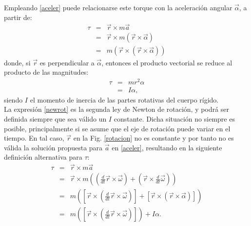 Empleando \eqref{aceler} puede relacionarse este torque con la aceleración angular $\vec{\alpha}$, a partir de:
\begin{eqnarray*}
\tau & = & \vec{r}\times m\vec{a}\\
     & = & \vec{r}\times m\left(\vec{r} \times \vec{\alpha}\right)\\
     & = & m\left(\vec{r}\times \left(\vec{r} \times \vec{\alpha}\right)\right)
\end{eqnarray*}
donde, si $\vec{r}$ es perpendicular a $\vec{\alpha}$, entonces el producto vectorial se reduce al producto de las magnitudes:
\begin{eqnarray}\label{newrot}
\nonumber \tau & = & m r^2 \alpha \\
               & = & I \alpha,
\end{eqnarray}
siendo $I$ el momento de inercia de las partes rotativas del cuerpo rígido.\\

La expresión \eqref{newrot} es la segunda ley de Newton de rotación, y podrá ser definida siempre que sea válido un $I$ constante. Dicha situación no siempre es posible, principalmente si se asume que el eje de rotación puede variar en el tiempo. En tal caso, $\vec{r}$ en la Fig. \ref{rotacion} no es constante y por tanto no es válida la solución propuesta para $\vec{a}$ en \eqref{aceler}, resultando en la siguiente definición alternativa para $\tau$:
\begin{eqnarray*}
\tau & = & \vec{r}\times m\vec{a}\\
     & = & \vec{r}\times m\left(\left( \frac{d}{dt}\vec{r}\times \vec{\omega}\right) + \left( \vec{r}\times \frac{d}{dt}\vec{\omega}\right)\right)\\
     & = & m\left(\left[\vec{r}\times\left( \frac{d}{dt}\vec{r}\times \vec{\omega}\right)\right] + \left[\vec{r}\times\left( \vec{r}\times \vec{\alpha}\right)\right]\right)\\
     & = & m\left(\left[\vec{r}\times\left( \frac{d}{dt}\vec{r}\times \vec{\omega}\right)\right]\right) + I\alpha.
\end{eqnarray*}\

